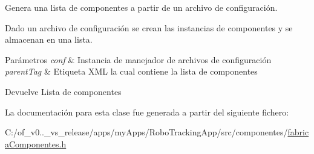 Genera una lista de componentes a partir de un archivo de configuración. 

Dado un archivo de configuración se crean las instancias de componentes y se almacenan en una lista.


\begin{DoxyParams}{Parámetros}
{\em conf} & Instancia de manejador de archivos de configuración \\
\hline
{\em parent\+Tag} & Etiqueta X\+M\+L la cual contiene la lista de componentes \\
\hline
\end{DoxyParams}
\begin{DoxyReturn}{Devuelve}
Lista de componentes 
\end{DoxyReturn}


La documentación para esta clase fue generada a partir del siguiente fichero\+:\begin{DoxyCompactItemize}
\item 
C\+:/of\+\_\+v0..\+\_\+vs\+\_\+release/apps/my\+Apps/\+Robo\+Tracking\+App/src/componentes/\hyperlink{fabrica_componentes_8h}{fabrica\+Componentes.\+h}\end{DoxyCompactItemize}
